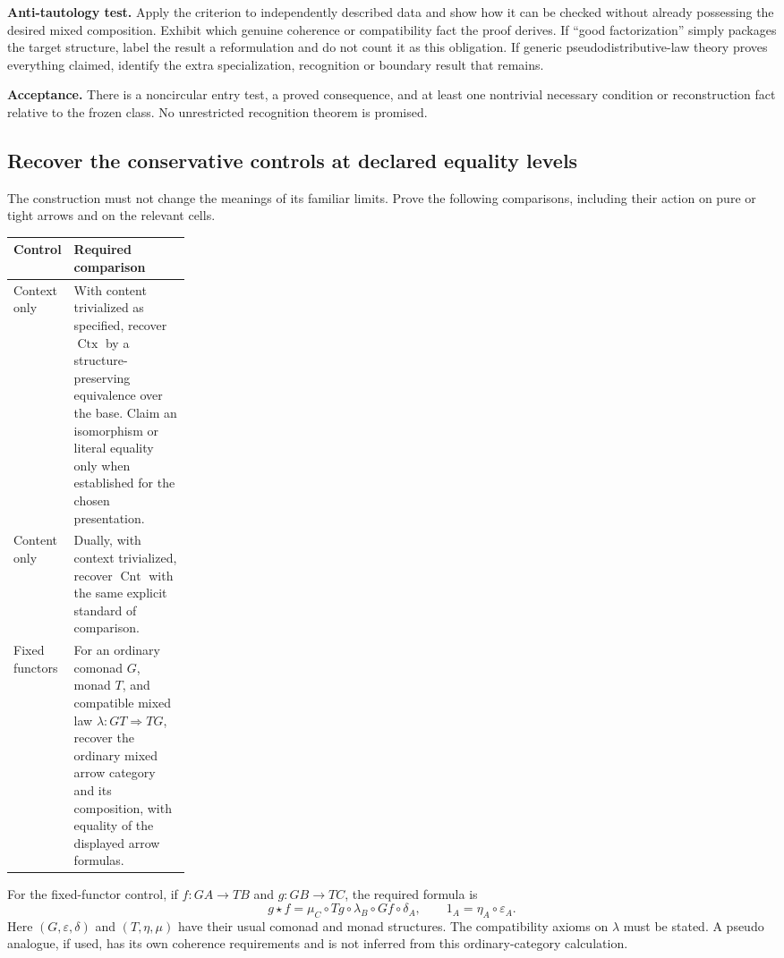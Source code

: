\documentclass[11pt,a4paper]{article}
\newcommand{\Ctx}{\operatorname{Ctx}}
\newcommand{\Cnt}{\operatorname{Cnt}}
\begin{document}
\textbf{Anti-tautology test.} Apply the criterion to independently described
data and show how it can be checked without already possessing the desired
mixed composition. Exhibit which genuine coherence or compatibility fact the
proof derives. If ``good factorization'' simply packages the target structure,
label the result a reformulation and do not count it as this obligation.
If generic pseudodistributive-law theory proves everything claimed, identify
the extra specialization, recognition or boundary result that remains.

\textbf{Acceptance.} There is a noncircular entry test, a proved consequence,
and at least one nontrivial necessary condition or reconstruction fact relative
to the frozen class. No unrestricted recognition theorem is promised.

\subsection{Recover the conservative controls at declared equality levels}

The construction must not change the meanings of its familiar limits. Prove
the following comparisons, including their action on pure or tight arrows and
on the relevant cells.

\begin{center}
\begin{tabularx}{\linewidth}{@{}p{0.23\linewidth}X@{}}
\toprule
Control & Required comparison \\
\midrule
Context only & With content trivialized as specified, recover \(\Ctx\) by a
structure-preserving equivalence over the base. Claim an isomorphism or literal
equality only when established for the chosen presentation. \\
Content only & Dually, with context trivialized, recover \(\Cnt\) with the same
explicit standard of comparison. \\
Fixed functors & For an ordinary comonad \(G\), monad \(T\), and compatible
mixed law \(\lambda:GT\Rightarrow TG\), recover the ordinary mixed arrow
category and its composition, with equality of the displayed arrow formulas. \\
\bottomrule
\end{tabularx}
\end{center}

For the fixed-functor control, if \(f:GA\to TB\) and \(g:GB\to TC\), the
required formula is
\[
 g\star f
 =\mu_C\circ T g\circ\lambda_B\circ G f\circ\delta_A,
 \qquad
 1_A=\eta_A\circ\varepsilon_A.
\]
Here \((G,\varepsilon,\delta)\) and \((T,\eta,\mu)\) have their usual
comonad and monad structures. The compatibility axioms on \(\lambda\) must be
stated. A pseudo analogue, if used, has its own coherence requirements and is
not inferred from this ordinary-category calculation.
\end{document}
